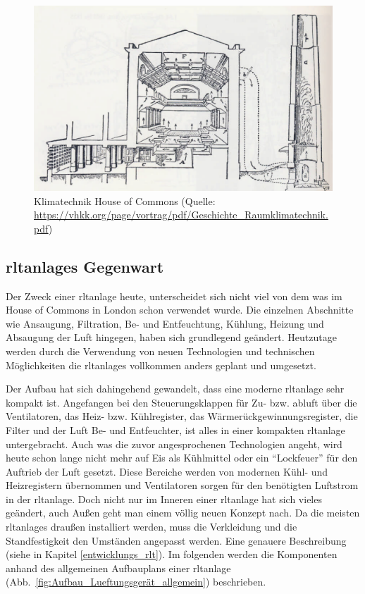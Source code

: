 \begin{figure}[ht]
	\centering
	\includegraphics[width=1\linewidth]{Bilder/Belueftung_House_of_Commons}
	\caption[Klimatechnik House of Commons  (Quelle: \url{https://vhkk.org/page/vortrag/pdf/Geschichte_Raumklimatechnik.pdf}, 
	Zugriff am 09.02.2024)]{Klimatechnik House of Commons  (Quelle: \url{https://vhkk.org/page/vortrag/pdf/Geschichte_Raumklimatechnik.pdf})}
	\label{fig:House_of_Commons_Klimatechnik}
\end{figure}



\subsection{\Acp{rltanlage} Gegenwart}
Der Zweck einer \ac{rltanlage} heute, unterscheidet sich nicht viel von dem was  im House of Commons in London schon verwendet wurde. Die einzelnen Abschnitte wie \zB Ansaugung, Filtration, Be- und Entfeuchtung, Kühlung, Heizung und Absaugung der Luft hingegen, haben sich grundlegend geändert. Heutzutage werden durch die Verwendung von neuen Technologien und technischen Möglichkeiten die \acp{rltanlage} vollkommen anders geplant und umgesetzt.

Der Aufbau hat sich dahingehend gewandelt, dass eine moderne \ac{rltanlage} sehr kompakt ist. Angefangen bei den Steuerungsklappen für Zu- bzw. \gls{abluft} über die Ventilatoren, das Heiz- bzw. Kühlregister, das Wärmerückgewinnungsregister, die Filter und der Luft Be- und Entfeuchter, ist alles in einer kompakten \ac{rltanlage} untergebracht. Auch was die zuvor angesprochenen Technologien angeht, wird heute schon lange nicht mehr auf Eis als Kühlmittel oder ein \enquote{Lockfeuer} für den Auftrieb der Luft gesetzt. Diese Bereiche werden \zB von modernen Kühl- und Heizregistern übernommen und Ventilatoren sorgen für den benötigten Luftstrom in der \ac{rltanlage}. Doch nicht nur im Inneren einer \ac{rltanlage} hat sich vieles geändert, auch Außen geht man einem völlig neuen Konzept nach. Da die meisten \acp{rltanlage} draußen installiert werden, muss die Verkleidung und die Standfestigkeit den Umständen angepasst werden. Eine genauere Beschreibung (siehe in Kapitel \ref{entwicklungs_rlt}).
Im folgenden werden die Komponenten anhand des allgemeinen Aufbauplans einer \ac{rltanlage} (Abb.~\ref{fig:Aufbau_Lueftungsgerät_allgemein}) beschrieben. 

